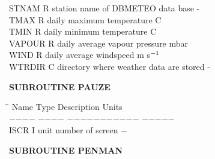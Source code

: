 \documentclass[11pt]{article}
\begin{document}
\begin{tabbing}
STNAM\> \> R\> station name of DBMETEO data base\> \> \> \> \> \> \> -\\
TMAX\> \> R\> daily maximum temperature\> \> \> \> \> \> \> \degrees C\\
TMIN\> \> R\> daily minimum temperature\> \> \> \> \> \> \> \degrees C\\
VAPOUR \> \> R\> daily average vapour pressure\> \> \> \> \> \> \> mbar\\
WIND\> \> R\> daily average windspeed\> \> \> \> \> \> \> m s$^{{\rm -1}}$\\
WTRDIR\> \> C\> directory where weather data are stored\> \> \> \> \> \> \> -
\end{tabbing}

\bigskip
\bigskip
\bigskip
\bigskip
{\bf SUBROUTINE PAUZE}     
\nwln
\begin{tabbing}
\hspace{1.27cm}\=\hspace{1.27cm}\=\hspace{1.27cm}\=\hspace{1.27cm}\=%
\hspace{1.27cm}\=\hspace{1.27cm}\=\hspace{1.27cm}\=\hspace{1.27cm}\=%
\hspace{1.27cm}\=\hspace{1.27cm}\=\kill
Name    \> \> Type   \> Description                                        \> \> \> \> \> \> \> Units\\
$-$$-$$-$$-$    \> \> $-$$-$$-$$-$   \> $-$$-$$-$$-$$-$$-$$-$$-$$-$$-$$-$                                        \> \> \> \> \> \> \> $-$$-$$-$$-$$-$\\
ISCR    \> \> I   \> unit number of screen                              \> \> \> \> \> \> \> $-$
\end{tabbing}

\bigskip
\bigskip
\bigskip
{\bf SUBROUTINE PENMAN}
\testlastline
\end{document}
